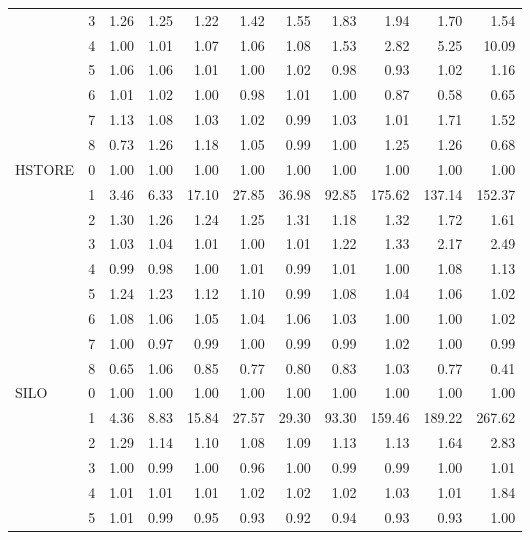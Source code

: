 \begin{tabular}{llrrrrrrrrr}
       & 3 &  1.26 &  1.25 &  1.22 &  1.42 &  1.55 &   1.83 &   1.94 &   1.70 &   1.54 \\
       & 4 &  1.00 &  1.01 &  1.07 &  1.06 &  1.08 &   1.53 &   2.82 &   5.25 &  10.09 \\
       & 5 &  1.06 &  1.06 &  1.01 &  1.00 &  1.02 &   0.98 &   0.93 &   1.02 &   1.16 \\
       & 6 &  1.01 &  1.02 &  1.00 &  0.98 &  1.01 &   1.00 &   0.87 &   0.58 &   0.65 \\
       & 7 &  1.13 &  1.08 &  1.03 &  1.02 &  0.99 &   1.03 &   1.01 &   1.71 &   1.52 \\
       & 8 &  0.73 &  1.26 &  1.18 &  1.05 &  0.99 &   1.00 &   1.25 &   1.26 &   0.68 \\
HSTORE & 0 &  1.00 &  1.00 &  1.00 &  1.00 &  1.00 &   1.00 &   1.00 &   1.00 &   1.00 \\
       & 1 &  3.46 &  6.33 & 17.10 & 27.85 & 36.98 &  92.85 & 175.62 & 137.14 & 152.37 \\
       & 2 &  1.30 &  1.26 &  1.24 &  1.25 &  1.31 &   1.18 &   1.32 &   1.72 &   1.61 \\
       & 3 &  1.03 &  1.04 &  1.01 &  1.00 &  1.01 &   1.22 &   1.33 &   2.17 &   2.49 \\
       & 4 &  0.99 &  0.98 &  1.00 &  1.01 &  0.99 &   1.01 &   1.00 &   1.08 &   1.13 \\
       & 5 &  1.24 &  1.23 &  1.12 &  1.10 &  0.99 &   1.08 &   1.04 &   1.06 &   1.02 \\
       & 6 &  1.08 &  1.06 &  1.05 &  1.04 &  1.06 &   1.03 &   1.00 &   1.00 &   1.02 \\
       & 7 &  1.00 &  0.97 &  0.99 &  1.00 &  0.99 &   0.99 &   1.02 &   1.00 &   0.99 \\
       & 8 &  0.65 &  1.06 &  0.85 &  0.77 &  0.80 &   0.83 &   1.03 &   0.77 &   0.41 \\
SILO & 0 &  1.00 &  1.00 &  1.00 &  1.00 &  1.00 &   1.00 &   1.00 &   1.00 &   1.00 \\
       & 1 &  4.36 &  8.83 & 15.84 & 27.57 & 29.30 &  93.30 & 159.46 & 189.22 & 267.62 \\
       & 2 &  1.29 &  1.14 &  1.10 &  1.08 &  1.09 &   1.13 &   1.13 &   1.64 &   2.83 \\
       & 3 &  1.00 &  0.99 &  1.00 &  0.96 &  1.00 &   0.99 &   0.99 &   1.00 &   1.01 \\
       & 4 &  1.01 &  1.01 &  1.01 &  1.02 &  1.02 &   1.02 &   1.03 &   1.01 &   1.84 \\
       & 5 &  1.01 &  0.99 &  0.95 &  0.93 &  0.92 &   0.94 &   0.93 &   0.93 &   1.00 \\

\end{tabular}
